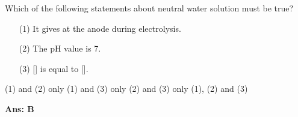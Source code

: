 \documentclass[border=3pt,varwidth=70mm]{standalone}
\begin{document}
 
Which of the following statements about neutral water solution must be true?

\begin{itemize}
\item[(1)] It gives  at the anode during electrolysis.
\item[(2)] The pH value is 7.
\item[(3)] [\ch{H3O^{+}{\aq}}] is equal to []. 
\end{itemize}

\begin{choices}
\choice (1) and (2) only
\choice (1) and (3) only
\choice (2) and (3) only
\choice (1), (2) and (3)
\end{choices}


\begin{answer}
\hrulefill\par
\textbf{Ans: B}

\end{answer}
\end{document}
